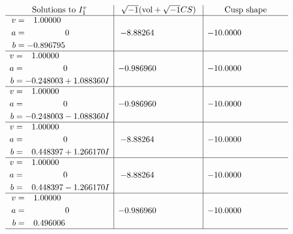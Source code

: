 \documentclass[1p]{elsarticle_modified}
\theoremstyle{definition}
\newcommand{\I}{\sqrt{-1}}
\begin{document}
$$\begin{array}{c|c|c}  
\text{Solutions to }I^v_{1}& \I (\text{vol} + \sqrt{-1}CS) & \text{Cusp shape}\\
 \hline 
\begin{aligned}
v &= \phantom{-}1.00000\phantom{ +0.000000I} \\
a &= \phantom{-0.000000 } 0 \\
b &= -0.896795\phantom{ +0.000000I}\end{aligned}
 & -8.88264\phantom{ +0.000000I} & -10.0000\phantom{ +0.000000I} \\ \hline\begin{aligned}
v &= \phantom{-}1.00000\phantom{ +0.000000I} \\
a &= \phantom{-0.000000 } 0 \\
b &= -0.248003 + 1.088360 I\end{aligned}
 & -0.986960\phantom{ +0.000000I} & -10.0000\phantom{ +0.000000I} \\ \hline\begin{aligned}
v &= \phantom{-}1.00000\phantom{ +0.000000I} \\
a &= \phantom{-0.000000 } 0 \\
b &= -0.248003 - 1.088360 I\end{aligned}
 & -0.986960\phantom{ +0.000000I} & -10.0000\phantom{ +0.000000I} \\ \hline\begin{aligned}
v &= \phantom{-}1.00000\phantom{ +0.000000I} \\
a &= \phantom{-0.000000 } 0 \\
b &= \phantom{-}0.448397 + 1.266170 I\end{aligned}
 & -8.88264\phantom{ +0.000000I} & -10.0000\phantom{ +0.000000I} \\ \hline\begin{aligned}
v &= \phantom{-}1.00000\phantom{ +0.000000I} \\
a &= \phantom{-0.000000 } 0 \\
b &= \phantom{-}0.448397 - 1.266170 I\end{aligned}
 & -8.88264\phantom{ +0.000000I} & -10.0000\phantom{ +0.000000I} \\ \hline\begin{aligned}
v &= \phantom{-}1.00000\phantom{ +0.000000I} \\
a &= \phantom{-0.000000 } 0 \\
b &= \phantom{-}0.496006\phantom{ +0.000000I}\end{aligned}
 & -0.986960\phantom{ +0.000000I} & -10.0000\phantom{ +0.000000I}\\
 \hline 
 \end{array}$$\newpage
\end{document}
